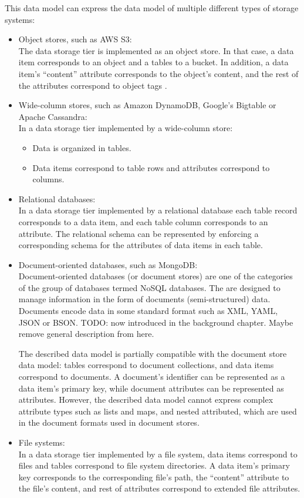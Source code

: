 This data model can express the data model of multiple different types of storage systems:
\begin{itemize}
  \item Object stores, such as AWS S3: \\
  The data storage tier is implemented as an object store.
  In that case, a data item corresponds to an object and a tables to a bucket.
  In addition, a data item's ``content'' attribute corresponds to the object's content, and the rest of the attributes
  correspond to object tags \cite{awss3:tagging}.

  \item Wide-column stores, such as Amazon DynamoDB, Google's Bigtable or Apache Cassandra: \\
  In a data storage tier implemented by a wide-column store:
  \begin{itemize}
    \item Data is organized in tables.
    \item Data items correspond to table rows and attributes correspond to columns.
  \end{itemize}
  \item Relational databases: \\
  In a data storage tier implemented by a relational database each table record corresponds to a data item, and each
  table column corresponds to an attribute.
  The relational schema can be represented by enforcing a corresponding schema for the attributes of data items in each
  table.

  \item Document-oriented databases, such as MongoDB: \\
  Document-oriented databases (or document stores) are one of the categories of the group of databases termed NoSQL
  databases.
  The are designed to manage information in the form of documents (semi-structured) data.
  Documents encode data in some standard format such as XML, YAML, JSON or BSON.
  TODO: now introduced in the background chapter. Maybe remove general description from here.

  The described data model is partially compatible with the document store data model:
  tables correspond to document collections, and data items correspond to documents.
  A document's identifier can be represented as a data item's primary key, while document attributes can be represented
  as attributes.
  However, the described data model cannot express complex attribute types such as lists and maps, and nested attributed,
  which are used in the document formats used in document stores.

  \item File systems: \\
  In a data storage tier implemented by a file system, data items correspond to files and tables correspond to file
  system directories.
  A data item's primary key corresponds to the corresponding file's path, the ``content'' attribute to the file's content,
  and rest of attributes correspond to extended file attributes.
\end{itemize}

